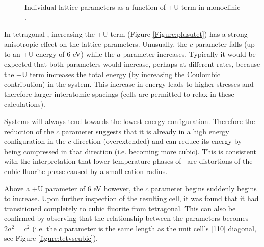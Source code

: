 \begin{figure} %
\begin{center}
		\caption{Individual lattice parameters as a function of +U term in monoclinic \zirconia .}
		\label{Figure:plusumono}
	\end{center}
\end{figure}

In tetragonal \zirconia , increasing the +U term (Figure \ref{Figure:plusutet}) has a strong anisotropic effect on the lattice parameters. Unusually, the $c$ parameter falls (up to an +U energy of 6 eV) while the $a$ parameter increases. Typically it would be expected that both parameters would increase, perhaps at different rates, because the +U term increases the total energy (by increasing the Coulombic contribution) in the system. This increase in energy leads to higher stresses and therefore larger interatomic spacings (cells are permitted to relax in these calculations).

Systems will always tend towards the lowest energy configuration. Therefore the reduction of the $c$ parameter suggests that it is already in a high energy configuration in the $c$ direction (overextended) and can reduce its energy by being compressed in that direction (i.e. becoming more cubic). This is consistent with the interpretation that lower temperature phases of \zirconia\ are distortions of the cubic fluorite phase caused by a small cation radius. 

Above a +U parameter of 6 eV however, the $c$ parameter begins suddenly begins to increase. Upon further inspection of the resulting cell, it was found that it had transitioned completely to cubic fluorite from tetragonal. This can also be confirmed by observing that the relationship between the parameters becomes $2a^2 = c^2$ (i.e. the $c$ parameter is the same length as the unit cell's [110] diagonal, see Figure \ref{figure:tetvscubic}).

